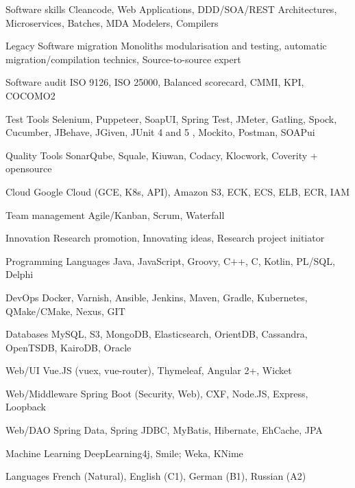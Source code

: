 

\begin{cvskills}

  \cvskill
  {Software skills} %
  {Cleancode, Web Applications, DDD/SOA/REST Architectures, Microservices, Batches, MDA Modelers, Compilers} %


  \cvskill
  {Legacy Software migration} %
  {Monoliths modularisation and testing, automatic migration/compilation technics, Source-to-source expert} %


  \cvskill
  {Software audit} %
  {ISO 9126, ISO 25000, Balanced scorecard, CMMI, KPI, COCOMO2} %

  \cvskill
  {Test Tools} %
  {Selenium, Puppeteer, SoapUI, Spring Test, JMeter, Gatling, Spock, Cucumber, JBehave, JGiven, JUnit 4 and 5 , Mockito, Postman, SOAPui} %

  \cvskill
  {Quality Tools} %
  {SonarQube, Squale, Kiuwan, Codacy, Klocwork, Coverity + opensource} %


  \cvskill
  {Cloud} %
  {Google Cloud (GCE, K8s, API), Amazon S3, ECK, ECS, ELB, ECR, IAM} %


  \cvskill
  {Team management} %
  {Agile/Kanban, Scrum, Waterfall} %

  \cvskill
  {Innovation} %
  {Research promotion, Innovating ideas, Research project initiator} %

  \cvskill
  {Programming Languages} %
  {Java, JavaScript, Groovy, C++, C, Kotlin, PL/SQL, Delphi} %
  
  \cvskill
  {DevOps} %
  {Docker, Varnish, Ansible, Jenkins, Maven, Gradle, Kubernetes, QMake/CMake, Nexus, GIT} %
  
  \cvskill
  {Databases} %
  {MySQL, S3, MongoDB, Elasticsearch, OrientDB, Cassandra, OpenTSDB, KairoDB, Oracle} %
  
  \cvskill
  {Web/UI} %
  {Vue.JS (vuex, vue-router), Thymeleaf, Angular 2+, Wicket} %
  
  \cvskill
  {Web/Middleware} %
  {Spring Boot (Security, Web), CXF, Node.JS, Express, Loopback} %
  
  
  \cvskill
  {Web/DAO} %
  {Spring Data, Spring JDBC, MyBatis, Hibernate, EhCache, JPA} %

  \cvskill
  {Machine Learning} %
  {DeepLearning4j, Smile; Weka, KNime} %
  

  \cvskill
    {Languages} %
    {French (Natural), English (C1), German (B1), Russian (A2)} %

\end{cvskills}
